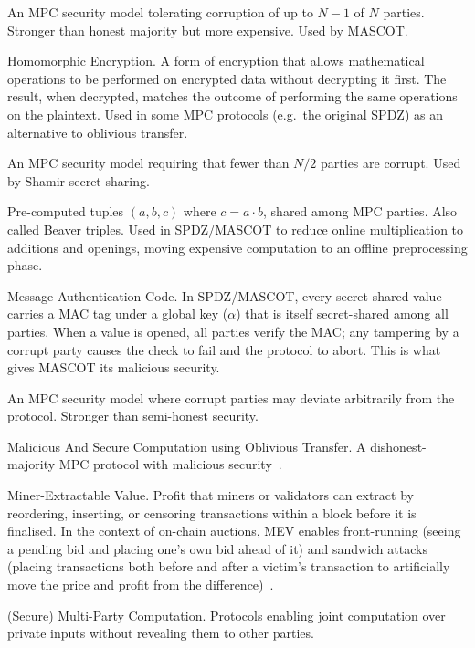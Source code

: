 \begin{description}[style=nextline, labelwidth=5cm, leftmargin=5.5cm]
  \item[Dishonest majority] An MPC security model tolerating corruption of up to $N{-}1$ of $N$ parties. Stronger than honest majority but more expensive. Used by MASCOT.
  \item[HE] Homomorphic Encryption. A form of encryption that allows mathematical operations to be performed on encrypted data without decrypting it first. The result, when decrypted, matches the outcome of performing the same operations on the plaintext. Used in some MPC protocols (e.g.\ the original SPDZ) as an alternative to oblivious transfer.
  \item[Honest majority] An MPC security model requiring that fewer than $N/2$ parties are corrupt. Used by Shamir secret sharing.
  \item[Integer triples] Pre-computed tuples $(a, b, c)$ where $c = a \cdot b$, shared among MPC parties. Also called Beaver triples. Used in SPDZ/MASCOT to reduce online multiplication to additions and openings, moving expensive computation to an offline preprocessing phase.
  \item[MAC] Message Authentication Code. In SPDZ/MASCOT, every secret-shared value carries a MAC tag under a global key ($\alpha$) that is itself secret-shared among all parties. When a value is opened, all parties verify the MAC; any tampering by a corrupt party causes the check to fail and the protocol to abort. This is what gives MASCOT its malicious security.
  \item[Malicious security] An MPC security model where corrupt parties may deviate arbitrarily from the protocol. Stronger than semi-honest security.
  \item[MASCOT] Malicious And Secure Computation using Oblivious Transfer. A dishonest-majority MPC protocol with malicious security~\cite{keller2016_mascot}.
  \item[MEV] Miner-Extractable Value. Profit that miners or validators can extract by reordering, inserting, or censoring transactions within a block before it is finalised. In the context of on-chain auctions, MEV enables front-running (seeing a pending bid and placing one's own bid ahead of it) and sandwich attacks (placing transactions both before and after a victim's transaction to artificially move the price and profit from the difference)~\cite{daian2019_flashboys2}.
  \item[MPC / SMPC] (Secure) Multi-Party Computation. Protocols enabling joint computation over private inputs without revealing them to other parties.

\end{description}
